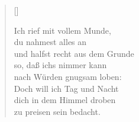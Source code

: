 \begin{center}
\settowidth{\versewidth}{Der, vor dem die Welt erschrickt,}
\begin{verse}[\versewidth]




 Ich rief mit vollem Munde,\\
du nahmest alles an\\
und halfst recht aus dem Grunde\\
so, daß ichs nimmer kann\\
nach Würden gnugsam loben:\\
Doch will ich Tag und Nacht\\
dich in dem Himmel droben\\
zu preisen sein bedacht.
  
\end{verse}
\end{center}


